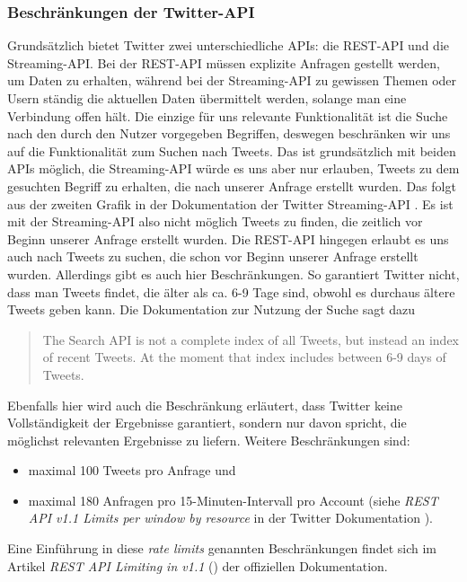 \subsubsection{Beschränkungen der Twitter-API}
Grundsätzlich bietet Twitter zwei unterschiedliche APIs: die REST-API und die Streaming-API. Bei der REST-API müssen explizite Anfragen gestellt  werden, um Daten zu erhalten, während bei der Streaming-API zu gewissen Themen oder Usern ständig die aktuellen Daten übermittelt werden, solange man eine Verbindung offen hält.
Die einzige für uns relevante Funktionalität ist die Suche nach den durch den Nutzer vorgegeben Begriffen, deswegen beschränken wir uns auf die Funktionalität zum Suchen nach Tweets.
Das ist grundsätzlich mit beiden APIs möglich, die Streaming-API würde es uns aber nur erlauben, Tweets zu dem gesuchten Begriff zu erhalten, die nach unserer Anfrage erstellt wurden. Das folgt aus der zweiten Grafik in der Dokumentation der Twitter Streaming-API \cite{TwitterStreamingAPIs2014}.
Es ist mit der Streaming-API also nicht möglich Tweets zu finden, die zeitlich vor Beginn unserer Anfrage erstellt wurden.
Die REST-API hingegen erlaubt es uns auch nach Tweets zu suchen, die schon vor Beginn unserer Anfrage erstellt wurden.
Allerdings gibt es auch hier  Beschränkungen.
So garantiert Twitter nicht, dass man Tweets findet, die älter als ca. 6-9 Tage sind, obwohl es durchaus ältere Tweets geben kann.
Die Dokumentation zur Nutzung der Suche \cite{TwitterUsingSearch2014} sagt dazu 
\begin{quote}
The Search API is not a complete index of all Tweets, but instead an index of recent Tweets. At the moment that index includes between 6-9 days of Tweets.
\end{quote}
Ebenfalls hier wird auch die Beschränkung erläutert, dass Twitter keine Vollständigkeit der Ergebnisse garantiert, sondern nur davon spricht, die möglichst relevanten Ergebnisse zu liefern.
Weitere Beschränkungen sind:
\begin{itemize}
\item maximal 100 Tweets pro Anfrage und
\item maximal 180 Anfragen pro 15-Minuten-Intervall pro Account (siehe \textit{REST API v1.1 Limits per window by resource} in der Twitter Dokumentation \cite{TwitterRESTLimitsperResource2014}).
\end{itemize}
Eine Einführung in diese \textit{rate limits} genannten Beschränkungen findet sich im Artikel \textit{REST API Limiting in v1.1} (\cite{TwitterRESTAPIv1.1}) der offiziellen Dokumentation.
